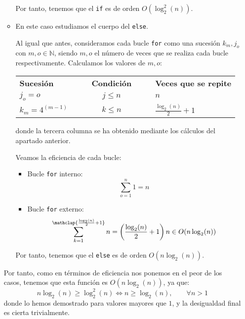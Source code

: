 \begin{ejercicio}
\begin{enumerate}[label=\alph*)]
\begin{itemize}
            Por tanto, tenemos que el \verb|if| es de orden $O(\log_2^2(n))$.


            \item En este caso estudiamos el cuerpo del \verb|else|.
            
            Al igual que antes, consideramos cada bucle \verb|for| como una sucesión $k_m , j_o$ con $m, o\in \mathbb{N}$, siendo $m, o$ el número de veces que se realiza cada bucle respectivamente. Calculamos los valores de $m,o$:
            \begin{center}
                \begin{tabular}{l l l c l l l}
                    \textbf{Sucesión}    &&&  \textbf{Condición} &&& \textbf{Veces que se repite}\\
                    $j_o = o$            &&& $j\leq n$           &&& $n$\\
                    $k_m = 4^{(m-1)}$    &&& $k\leq n$           &&& $\frac{\log_2(n)}{2} +1$\\
                \end{tabular}
            \end{center}
            donde la tercera columna se ha obtenido mediante los cálculos del apartado anterior.
            
            Veamos la eficiencia de cada bucle:
            \begin{itemize}
                \item Bucle \verb|for| interno:
                \begin{equation*}
                    \sum_{o=1}^n 1= n
                \end{equation*}

                \item Bucle \verb|for| externo:
                \begin{equation*}
                    \sum_{k=1}^{\mathclap{\frac{\log_2(n)}{2}+1}} n = \left(\frac{\log_2(n)}{2}+1\right)n \in O(n\log_2(n))
                \end{equation*}
            \end{itemize}
            
            Por tanto, tenemos que el \verb|else| es de orden $O(n\log_2(n))$.
            \end{itemize}

        Por tanto, como en términos de eficiencia nos ponemos en el peor de los casos, tenemos que esta función es $O(n\log_2(n))$, ya que:
        \begin{equation*}
            n\log_2(n)\geq \log_2^2(n) \Longleftrightarrow n\geq \log_2(n), \qquad \forall n> 1
        \end{equation*}
        donde lo hemos demostrado para valores mayores que $1$, y la desigualdad final es cierta trivialmente.




\end{enumerate}
\end{ejercicio}
